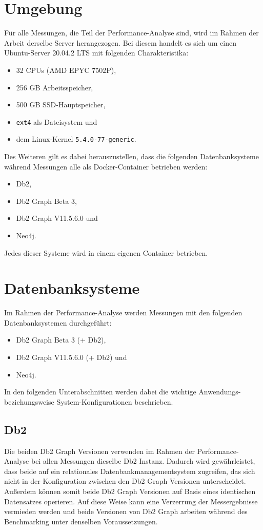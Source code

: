 \section{Umgebung}
\label{analyse:umgebung}
Für alle Messungen, die Teil der Performance-Analyse sind, wird im Rahmen der Arbeit derselbe Server herangezogen. Bei diesem handelt es sich um einen Ubuntu-Server 20.04.2 LTS mit folgenden Charakteristika:
\begin{itemize}
    \item 32 CPUs (AMD EPYC 7502P), 
    \item 256 GB Arbeitsspeicher,
    \item 500 GB SSD-Hauptspeicher,
    \item \texttt{ext4} als Dateisystem und 
    \item dem Linux-Kernel \texttt{5.4.0-77-generic}.
\end{itemize}
Des Weiteren gilt es dabei herauszustellen, dass die folgenden Datenbanksysteme während Messungen alle als Docker-Container betrieben werden: 
\begin{itemize}
    \item Db2,
    \item Db2 Graph Beta 3,
    \item Db2 Graph V11.5.6.0 und 
    \item Neo4j. 
\end{itemize}
Jedes dieser Systeme wird in einem eigenen Container betrieben. 

\section{Datenbanksysteme}
\label{analyse:datanbanksysteme}
Im Rahmen der Performance-Analyse werden Messungen mit den folgenden Datenbanksystemen durchgeführt: 
\begin{itemize}
    \item Db2 Graph Beta 3 (+ Db2),
    \item Db2 Graph V11.5.6.0 (+ Db2) und
    \item Neo4j.
\end{itemize}
In den folgenden Unterabschnitten werden dabei die wichtige Anwendungs- be\-zieh\-ungs\-wei\-se System-Konfigurationen beschrieben. 

\subsection{Db2}
Die beiden Db2 Graph Versionen verwenden im Rahmen der Performance-Analyse bei allen Messungen dieselbe Db2 Instanz. Dadurch wird gewährleistet, dass beide auf ein relationales Datenbankmanagementsystem zugreifen, das sich nicht in der Konfiguration zwischen den Db2 Graph Versionen unterscheidet. Außerdem können somit beide Db2 Graph Versionen auf Basis eines identischen Datensatzes operieren. Auf diese Weise kann eine Verzerrung der Messergebnisse vermieden werden und beide Versionen von Db2 Graph arbeiten während des Benchmarking unter denselben Voraussetzungen.

